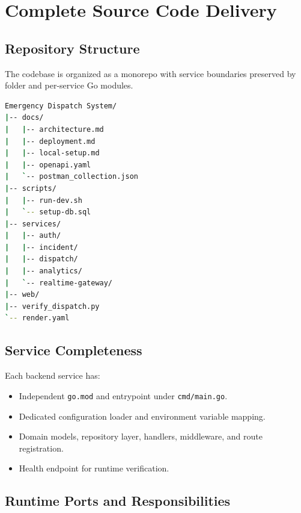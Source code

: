 \documentclass[12pt,a4paper]{report}
\begin{document}
\chapter{Complete Source Code Delivery}

\section{Repository Structure}

The codebase is organized as a monorepo with service boundaries preserved by folder and per-service Go modules.

\begin{lstlisting}[language=bash, caption=Phase 4 Repository Structure (Condensed), numbers=none]
Emergency Dispatch System/
|-- docs/
|   |-- architecture.md
|   |-- deployment.md
|   |-- local-setup.md
|   |-- openapi.yaml
|   `-- postman_collection.json
|-- scripts/
|   |-- run-dev.sh
|   `-- setup-db.sql
|-- services/
|   |-- auth/
|   |-- incident/
|   |-- dispatch/
|   |-- analytics/
|   `-- realtime-gateway/
|-- web/
|-- verify_dispatch.py
`-- render.yaml
\end{lstlisting}

\section{Service Completeness}

Each backend service has:

\begin{itemize}
	\item Independent \texttt{go.mod} and entrypoint under \texttt{cmd/main.go}.
	\item Dedicated configuration loader and environment variable mapping.
	\item Domain models, repository layer, handlers, middleware, and route registration.
	\item Health endpoint for runtime verification.
\end{itemize}

\section{Runtime Ports and Responsibilities}
\end{document}
